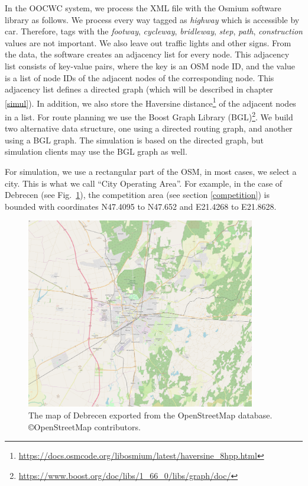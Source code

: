 \documentclass[b5paper,12pt]{report}
\theoremstyle{definition}
\begin{document}
In the OOCWC system, we process the XML file with the Osmium software library as follows. We process every way tagged as \textit{highway} which is accessible by car. Therefore, tags with the \textit{footway}, \textit{cycleway}, \textit{bridleway}, \textit{step}, \textit{path}, \textit{construction} values are not important. We also leave out traffic lights and other signs. From the data, the software creates an adjacency list for every node. This adjacency list consists of key-value pairs, where the key is an OSM node ID, and the value is a list of node IDs of the adjacent nodes of the corresponding node. This adjacency list defines a directed graph (which will be described in chapter \ref{simul}). In addition, we also store the Haversine distance\footnote{\url{https://docs.osmcode.org/libosmium/latest/haversine_8hpp.html}} of the adjacent nodes in a list. For route planning we use the Boost Graph Library (BGL)\footnote{\url{https://www.boost.org/doc/libs/1_66_0/libs/graph/doc/}}. We build two alternative data structure, one using a directed routing graph, and another using a BGL graph. The simulation is based on the directed graph, but simulation clients may use the BGL graph as well.

For simulation, we use a rectangular part of the OSM, in most cases, we select a city. This is what we call \enquote{City Operating Area}. For example, in the case of Debrecen (see Fig.~\ref{debrecen_map}), the competition area (see section \ref{competition}) is bounded with coordinates N47.4095 to N47.652 and E21.4268 to E21.8628.

\begin{figure}[ht!]
\centering
\includegraphics[width=10cm]{img/debrecen_coa.png}
\caption{The map of Debrecen exported from the OpenStreetMap database. \copyright OpenStreetMap contributors.}
\label{debrecen_map}
\end{figure}
\end{document}
